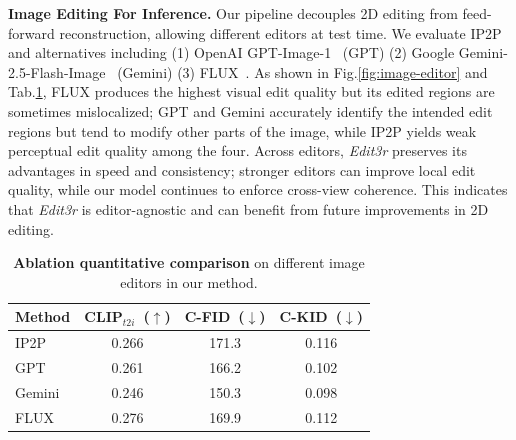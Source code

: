 \documentclass[10pt,twocolumn,letterpaper]{article}
\newcommand{\ourmethod}{\textit{Edit3r}}
\begin{document}
\vspace{1mm}
\noindent\textbf{Image Editing For Inference.}
Our pipeline decouples 2D editing from feed-forward reconstruction, allowing different editors at test time. We evaluate IP2P~\cite{ip2p} and alternatives including (1) OpenAI GPT-Image-1~\cite{gpt4o} (GPT) (2) Google Gemini-2.5-Flash-Image~\cite{geminiteam2025geminifamilyhighlycapable} (Gemini) (3) FLUX~\cite{labs2025flux1kontextflowmatching}. 
As shown in Fig.\ref{fig:image-editor} and Tab.\ref{tab:image_editor}, FLUX produces the highest visual edit quality but its edited regions are sometimes mislocalized; GPT and Gemini accurately identify the intended edit regions but tend to modify other parts of the image, while IP2P yields weak perceptual edit quality among the four.
Across editors, {\ourmethod} preserves its advantages in speed and consistency; stronger editors can improve local edit quality, while our model continues to enforce cross-view coherence. This indicates that {\ourmethod} is editor-agnostic and can benefit from future improvements in 2D editing.

\begin{table}[t]
\centering
\scriptsize
\caption{\textbf{Ablation quantitative comparison} on different image editors in our method.}
\vspace{-2mm}
\label{tab:image_editor}
\setlength{\tabcolsep}{6pt}
\renewcommand{\arraystretch}{1.1}

\begin{tabular}{l@{\hskip 8.0mm}c@{\hskip 8.0mm}c@{\hskip 8.0mm}c}
\toprule
\textbf{Method} & \textbf{CLIP$_{t2i}$~(\(\uparrow\))} &
\textbf{C-FID~(\(\downarrow\))} & \textbf{C-KID~(\(\downarrow\))} \\
\midrule
IP2P~\cite{ip2p}  & 0.266 & 171.3 & 0.116 \\
GPT~\cite{gpt4o}    & 0.261 & 166.2 & 0.102 \\ Gemini~\cite{geminiteam2025geminifamilyhighlycapable}  & 0.246 & 150.3 & 0.098 \\
FLUX~\cite{labs2025flux1kontextflowmatching}  & 0.276 & 169.9 & 0.112 \\
\bottomrule
\end{tabular}
\vspace{-4mm}
\end{table}
%


\end{document}

